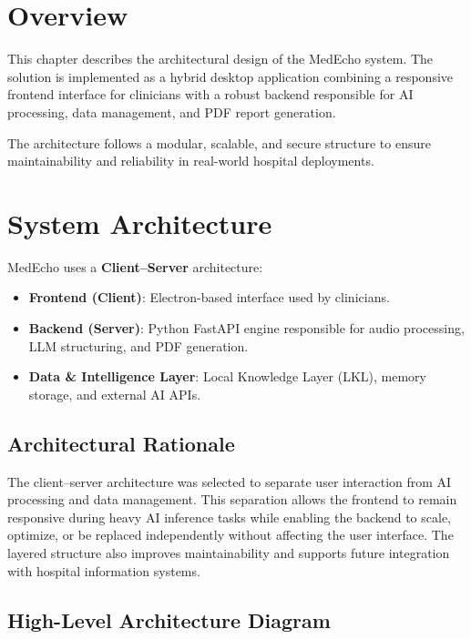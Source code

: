 

\label{chapter:design}

\section{Overview}
\label{sec:design:overview}
This chapter describes the architectural design of the MedEcho system. The solution is 
implemented as a hybrid desktop application combining a responsive frontend interface for 
clinicians with a robust backend responsible for AI processing, data management, and PDF 
report generation.

The architecture follows a modular, scalable, and secure structure to ensure maintainability 
and reliability in real-world hospital deployments.

\section{System Architecture}
\label{sec:design:architecture}
MedEcho uses a \textbf{Client–Server} architecture:

\begin{itemize}
    \item \textbf{Frontend (Client)}: Electron-based interface used by clinicians.
    \item \textbf{Backend (Server)}: Python FastAPI engine responsible for audio processing, 
          LLM structuring, and PDF generation.
    \item \textbf{Data \& Intelligence Layer}: Local Knowledge Layer (LKL), memory storage, 
          and external AI APIs.
\end{itemize}
\subsection*{Architectural Rationale}

The client–server architecture was selected to separate user interaction from AI processing and data management. This separation allows the frontend to remain responsive during heavy AI inference tasks while enabling the backend to scale, optimize, or be replaced independently without affecting the user interface. The layered structure also improves maintainability and supports future integration with hospital information systems.

\subsection{High-Level Architecture Diagram}

